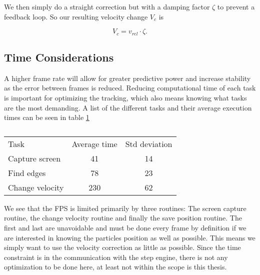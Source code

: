 We then simply do a straight correction but with a damping factor $\zeta$ to prevent a feedback loop. So our resulting velocity change $V_c$ is 

\begin{equation}
V_c = v_{rel}\cdot \zeta.
\end{equation}

\subsection{Time Considerations}\label{sec:time considerations}
A higher frame rate will allow for greater predictive power and increase stability as the error between frames is 
reduced. Reducing computational time of each task is important for optimizing the tracking, which also means knowing 
what tasks are the most demanding. A list of the different tasks and their average execution times can be seen in table 
\ref{tab:benchmarks}


\begin{table}[H]
 \begin{tabular}{l | c | c } 
 Task  			&  Average time & Std deviation \\
 Capture screen & 41 			& 14 \\
 Find edges 	& 78			& 23 \\
 Change velocity& 230			& 62 \\
 \end{tabular}
 \caption{}
 \label{tab:benchmarks}
\end{table}

We see that the FPS is limited primarily by three routines: The screen capture routine, the change velocity routine and finally the save position routine. The first and last are unavoidable and must be done every frame by definition if we are interested in knowing the particles position as well as possible. This means we simply want to use the velocity correction as little as possible. Since the time constraint is in the communication with the step engine, there is not any optimization to be done here, at least not within the scope is this thesis. 
